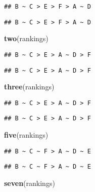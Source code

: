 \documentclass[]{article}
\newenvironment{Shaded}{\begin{snugshade}}{\end{snugshade}}
\newcommand{\KeywordTok}[1]{\textcolor[rgb]{0.13,0.29,0.53}{\textbf{#1}}}
\newcommand{\NormalTok}[1]{#1}
\begin{document}
\begin{verbatim}
## B ~ C > E > F > A ~ D
\end{verbatim}

\begin{verbatim}
## B ~ C > E > F > A ~ D
\end{verbatim}

\begin{Shaded}
\begin{Highlighting}[]
\KeywordTok{two}\NormalTok{(rankings)}
\end{Highlighting}
\end{Shaded}

\begin{verbatim}
## B ~ C > E > A ~ D > F
\end{verbatim}

\begin{verbatim}
## B ~ C > E > A ~ D > F
\end{verbatim}

\begin{Shaded}
\begin{Highlighting}[]
\KeywordTok{three}\NormalTok{(rankings)}
\end{Highlighting}
\end{Shaded}

\begin{verbatim}
## B ~ C > E > A ~ D > F
\end{verbatim}

\begin{verbatim}
## B ~ C > E > A ~ D > F
\end{verbatim}

\begin{Shaded}
\begin{Highlighting}[]
\KeywordTok{five}\NormalTok{(rankings)}
\end{Highlighting}
\end{Shaded}

\begin{verbatim}
## B ~ C ~ F > A ~ D ~ E
\end{verbatim}

\begin{verbatim}
## B ~ C ~ F > A ~ D ~ E
\end{verbatim}

\begin{Shaded}
\begin{Highlighting}[]
\KeywordTok{seven}\NormalTok{(rankings)}
\end{Highlighting}
\end{Shaded}
\end{document}
